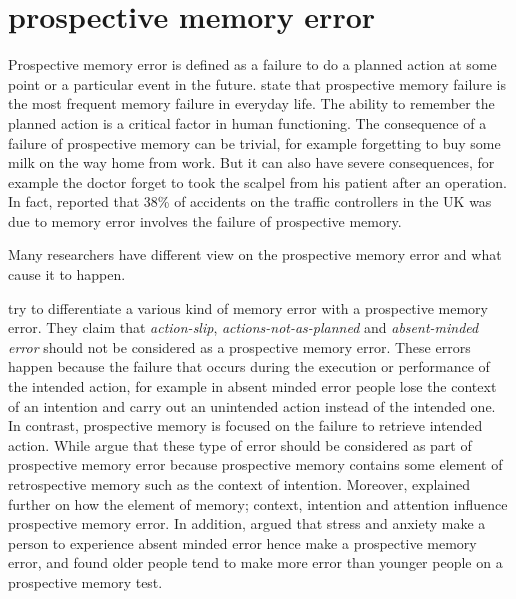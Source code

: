 \section{prospective memory error}

Prospective memory error is defined as a failure to do a planned action at some point or a particular event in the future.
\cite{Kliegel1984} state that prospective memory failure is the most frequent memory failure in everyday life.
The ability to remember the planned action is a critical factor in human functioning. The consequence of a failure of prospective memory can be trivial, for example forgetting to buy some milk on the way home from work.
But it can also have severe consequences, for example the doctor forget to took the scalpel from his patient after an operation.
In fact, \cite{Shorrock2005} reported that 38\% of accidents on the traffic controllers in the UK was due to memory error involves the failure of prospective memory.

Many researchers have different view on the prospective memory error and what cause it to happen.

\cite{LiaKvavilashviliAndJudiEllis} try to differentiate a various kind of memory error with a prospective memory error. They claim that \textit{action-slip}\citep{HeckhausenHeinz1990IAaA},
 \textit{actions-not-as-planned} \citep{Reason1979-REAANA-2} and \textit{absent-minded error} \citep{cohen2008memory} should not be considered as a prospective memory error. These errors happen because the failure that occurs during the execution or performance of the intended action, for example in absent minded error people lose the context of an intention and carry out an unintended action instead of the intended one. In contrast, prospective memory is focused on the failure to retrieve intended action.
While \cite{10.1371/journal.pone.0074447} argue that these type of error should be considered as part of prospective memory error because prospective memory contains some element of retrospective memory such as the context of intention. Moreover, \cite{Reason1984} explained further on how the element of memory; context, intention and attention influence prospective memory error.  In addition, \cite{Cockburn1994} argued that stress and anxiety make a person to experience absent minded error hence make a
prospective memory error, and \cite{Scullin2012} found older people tend to make more error than younger people on a prospective memory test.

